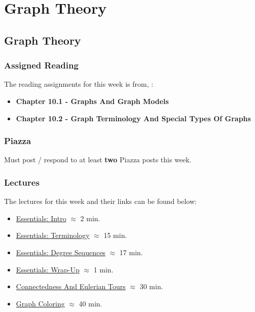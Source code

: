 \clearpage

\renewcommand{\ChapTitle}{Graph Theory}
\renewcommand{\SectionTitle}{Graph Theory}

\chapter{\ChapTitle}
\section{\SectionTitle}

\subsection{Assigned Reading}

The reading assignments for this week is from, \Textbook:

\begin{itemize}
    \item \textbf{Chapter 10.1 - Graphs And Graph Models}
    \item \textbf{Chapter 10.2 - Graph Terminology And Special Types Of Graphs}
\end{itemize}

\subsection{Piazza}

Must post / respond to at least \textbf{two} Piazza posts this week.

\subsection{Lectures}

The lectures for this week and their links can be found below:

\begin{itemize}
    \item \href{https://applied.cs.colorado.edu/mod/hvp/view.php?id=51873}{Essentials: Intro} $\approx$ 2 min.
    \item \href{https://applied.cs.colorado.edu/mod/hvp/view.php?id=51874}{Essentials: Terminology} $\approx$ 15 min.
    \item \href{https://applied.cs.colorado.edu/mod/hvp/view.php?id=51875}{Essentials: Degree Sequences} $\approx$ 17 min.
    \item \href{https://applied.cs.colorado.edu/mod/hvp/view.php?id=51876}{Essentials: Wrap-Up} $\approx$ 1 min.
    \item \href{https://applied.cs.colorado.edu/mod/hvp/view.php?id=51877}{Connectedness And Eulerian Tours} $\approx$ 30 min.
    \item \href{https://applied.cs.colorado.edu/mod/hvp/view.php?id=51878}{Graph Coloring} $\approx$ 40 min.
\end{itemize}

